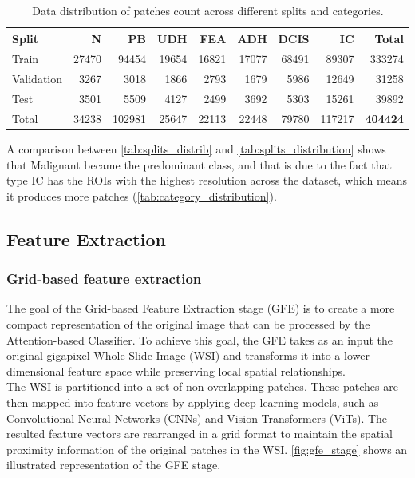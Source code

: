 \documentclass[
11pt, %
english, %
singlespacing, %
headsepline, %
]{project_structure}
\begin{document}
\begin{table}[ht]
    \centering
    \small
    \begin{adjustbox}{max width=\textwidth} %
        \begin{tabular}{@{}l|rrrrrrrr}
            \toprule
            Split & \acrshort{N} & \acrshort{PB} & \acrshort{UDH} & \acrshort{FEA} & \acrshort{ADH} & \acrshort{DCIS} & \acrshort{IC} & Total \\
            \midrule
            Train & 27470 & 94454 & 19654 & 16821 & 17077 & 68491 & 89307 & 333274 \\
            Validation & 3267 & 3018 & 1866 & 2793 & 1679 & 5986 & 12649 & 31258 \\
            Test & 3501 & 5509 & 4127 & 2499 & 3692 & 5303 & 15261 & 39892 \\
            \midrule
            Total & 34238 & 102981 & 25647 & 22113 & 22448 & 79780 & 117217 & \textbf{404424} \\
            \bottomrule
        \end{tabular}
    \end{adjustbox}
    \caption{Data distribution of patches count across different splits and categories.}
    \label{tab:category_distribution}
\end{table}

\newpage
\noindent A comparison between \autoref{tab:splits_distrib} and \autoref{tab:splits_distribution} shows that Malignant became the predominant class, and that is due to the fact that type IC has the ROIs with the highest resolution across the dataset, which means it produces more patches (\autoref{tab:category_distribution}).

\subsection{Feature Extraction}

\subsubsection{Grid-based feature extraction}
The goal of the Grid-based Feature Extraction stage (\acrshort{GFE}) is to create a more compact representation of the original image that can be processed by the Attention-based Classifier. To achieve this goal, the \acrshort{GFE} takes as an input the original gigapixel Whole Slide Image (\acrshort{WSI}) and transforms it into a lower dimensional feature space while preserving local spatial relationships.\\
The \acrshort{WSI} is partitioned into a set of non overlapping patches. These patches are then mapped into feature vectors by applying deep learning models, such as Convolutional Neural Networks (\acrshort{CNN}s) and Vision Transformers (\acrshort{ViT}s). The resulted feature vectors are rearranged in a grid format to maintain the spatial proximity information of the original patches in the \acrshort{WSI}.  \autoref{fig:gfe_stage} shows an illustrated representation of the \acrshort{GFE} stage.
\end{document}
